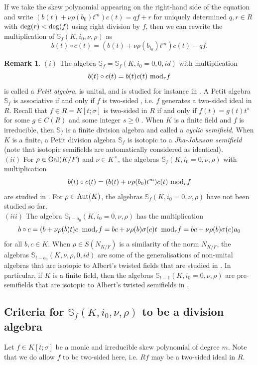 \documentclass[12pt]{amsart}
\theoremstyle{plain}
\theoremstyle{definition}
\newtheorem{remark}[theorem]{Remark}
\numberwithin{equation}{section}
\numberwithin{figure}{section}
\begin{document}
If we take  the skew polynomial appearing on the right-hand side of the equation and write $(b(t)+\nu\rho(b_0)t^m )c(t)=qf+r$ for uniquely determined $q,r\in R$ with ${\rm deg}(r)<{\rm deg}(f)$ using right
division by $f$, then we can rewrite the multiplication of $\mathbb{S}_f(K,i_0,\nu,\rho)$ as
  $$b(t)\circ c(t)= (b(t)+\nu\rho(b_{i_0})t^m )c(t)-qf.$$


\begin{remark} $(i)$
 The algebra $\mathbb{S}_f= \mathbb{S}_f(K,i_0=0, 0, id)$ with multiplication
$$b(t)\circ c(t)=b(t) c(t)\,\,{\rm mod}_r f$$
is called a \emph{Petit algebra}, is unital,  and is studied for instance in
\cite{BP, BPhD, LS, P66}. A Petit algebra
 $\mathbb{S}_f$ is  associative if and only if $f$ is  two-sided \cite{P66}, i.e. $f$ generates a two-sided ideal in $R$. Recall that $f\in R=K[t;\sigma]$ is two-sided in $R$ if and only if $f(t)=g(t)t^s$ for some $g \in C(R)$ and some
integer $s\geq 0$  \cite[Theorem 1.1.22]{J96}.
  When $K$ is a finite field and $f$ is irreducible, then $\mathbb{S}_f$ is a finite division algebra and called a \emph{cyclic semifield}. When $K$ is a finite, a Petit division algebra
 $\mathbb{S}_f$  is isotopic to a
 \emph{Jha-Johnson semifield} (note that isotopic semifields are automatically considered as identical).
  \\ $(ii)$ For $\rho\in {\rm Gal}(K/F)$ and $\nu\in K^\times$, the  algebras  $\mathbb{S}_f(K,i_0=0,\nu,\rho)$
  with multiplication
  $$b(t)\circ c(t)=(b(t)+\nu\rho(b_0)t^m) c(t)\,\,{\rm mod}_r f$$
are studied in \cite{PT2, DT2020, Sheekey}. For $\rho\in {\rm Aut}(K)$, the  algebras  $\mathbb{S}_f(K,i_0=0,\nu,\rho)$ have not been studied so far.
 \\ $(iii)$ The algebra
  $\mathbb{S}_{t-a_0}(K,i_0=0,\nu,\rho)$ has the multiplication
$$b\circ c = (b+\nu\rho(b)t)c\: \,\,{\rm mod}_r f
= bc+\nu\rho(b)\sigma(c)t\: \,\,{\rm mod}_r f
= bc+\nu\rho(b)\sigma(c)a_0$$
for all $b,c\in K$.  When  $\rho\in S(N_{K/F})$ is a similarity of the norm $N_{K/F}$,  the algebras  $\mathbb{S}_{t-a_0}(K,\nu,\rho,0, id)$
are some of the generalisations of non-unital algebras that are isotopic to Albert's twisted fields that are studied in \cite{P15}.
In particular, if $K$ is a finite field, then
the algebras  $\mathbb{S}_{t-1}(K,i_0=0,\nu,\rho)$  are  pre-semifields that are isotopic to Albert's twisted semifields in \cite{A}.
\end{remark}


\subsection{Criteria for $\mathbb{S}_f(K,i_0,\nu,\rho)$ to be a division algebra}
Let $f\in  K[t;\sigma]$ be a monic and irreducible skew polynomial of degree $m$.
Note that we do allow $f$ to be two-sided here, i.e. $Rf$ may be a two-sided ideal in $R$.
\end{document}
